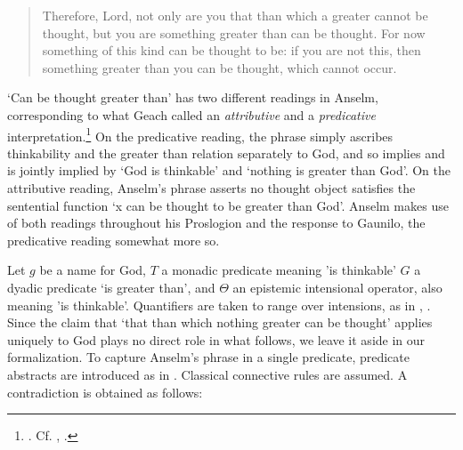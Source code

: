 \documentclass[]{amsart}
\begin{document}
\begin{quote}
Therefore, Lord, not only are you that than which a greater cannot be thought, but you are something greater than can be thought. For now something of this kind can be thought to be: if you are not this, then something greater than you can be thought, which cannot occur.
\end{quote}

`Can be thought greater than' has two different readings in Anselm, corresponding to what Geach called an \textit{attributive} and a \textit{predicative} interpretation.\footnote{\cite{Geach1956}. Cf. \cite{Thomson1997}, \cite{Almotahari2015}.} On the predicative reading, the phrase simply ascribes thinkability and the greater than relation separately to God, and so implies and is jointly implied by `God is thinkable' and `nothing is greater than God'. On the attributive reading, Anselm's phrase asserts no thought object satisfies the sentential function `x can be thought to be greater than God'. Anselm makes use of both readings throughout his Proslogion and the response to Gaunilo, the predicative reading somewhat more so. 

Let $g$ be a name for God, $T$ a monadic predicate meaning 'is thinkable'  $G$ a dyadic predicate `is greater than', and $\Theta$ an epistemic intensional operator, also meaning 'is thinkable'. Quantifiers are taken to range over intensions, as in \cite{CIFOL1}, \cite{CIFOL2}. Since the claim that `that than which nothing greater can be thought' applies uniquely to God plays no direct role in what follows, we leave it aside in our formalization. To capture Anselm's phrase in a single predicate, predicate abstracts are introduced as in \cite{Fitting1998}. Classical connective rules are assumed. A contradiction is obtained as follows:

\bigskip


\bigskip
\end{document}
